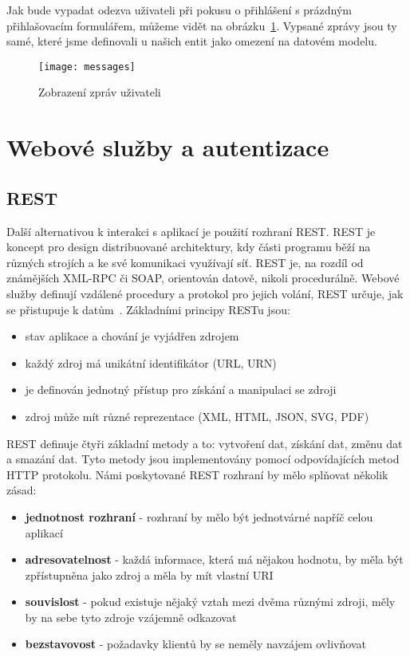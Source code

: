 \documentclass[122pt,oneside]{fithesis}
\begin{document}
Jak bude vypadat odezva uživateli při pokusu o přihlášení s prázdným přihlašovacím formulářem, můžeme vidět na obrázku~\ref{img:messages}. Vypsané zprávy jsou ty samé, které jsme definovali u našich entit jako omezení na datovém modelu.  

\begin{figure}[!ht]
\centering
\texttt{[image: messages]}
\caption{Zobrazení zpráv uživateli}
\label{img:messages}
\end{figure}

\chapter{Webové služby a autentizace}
\section{REST}
\label{rest}
Další alternativou k interakci s aplikací je použití rozhraní REST. REST je koncept pro design distribuované architektury, kdy části programu běží na různých strojích a ke své komunikaci využívají síť. REST je, na rozdíl od známějších XML-RPC či SOAP, orientován datově, nikoli procedurálně. Webové služby definují vzdálené procedury a protokol pro jejich volání, REST určuje, jak se přistupuje k datům~\cite{maly09}. Základními principy RESTu jsou:

\begin{itemize}
  \item stav aplikace a chování je vyjádřen zdrojem
  \item každý zdroj má unikátní identifikátor (URL, URN)
  \item je definován jednotný přístup pro získání a manipulaci se zdroji
  \item zdroj může mít různé reprezentace (XML, HTML, JSON, SVG, PDF)
\end{itemize}

REST definuje čtyři základní metody a to: vytvoření dat, získání dat, změnu dat a smazání dat. Tyto metody jsou implementovány pomocí odpovídajících metod HTTP protokolu. Námi poskytované REST rozhraní by mělo splňovat několik zásad:

\begin{itemize}
  \item {\bf jednotnost rozhraní} - rozhraní by mělo být jednotvárné napříč celou aplikací
  \item {\bf adresovatelnost} - každá informace, která má nějakou hodnotu, by měla být zpřístupněna jako zdroj a měla by mít vlastní URI
  \item {\bf souvislost} - pokud existuje nějaký vztah mezi dvěma různými zdroji, měly by na sebe tyto zdroje vzájemně odkazovat
  \item {\bf bezstavovost} - požadavky klientů by se neměly navzájem ovlivňovat 
\end{itemize}
\end{document}
